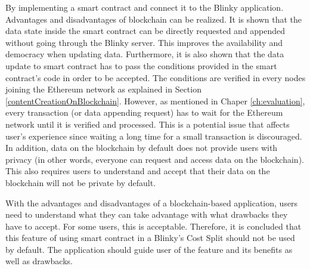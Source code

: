 \documentclass[twoside,numperchapter]{tutthesis} %
\newif\ifnameyear
\begin{document}
By implementing a smart contract and connect it to the Blinky application. Advantages and disadvantages of blockchain can be realized. It is shown that the data state inside the smart contract can be directly requested and appended without going through the Blinky server. This improves the availability and democracy when updating data. Furthermore, it is also shown that the data update to smart contract has to pass the conditions provided in the smart contract's code in order to be accepted. The conditions are verified in every nodes joining the Ethereum network as explained in Section \ref{contentCreationOnBlockchain}. However, as mentioned in Chaper \ref{ch:evaluation}, every transaction (or data appending request) has to wait for the Ethereum network until it is verified and processed. This is a potential issue that affects user's experience since waiting a long time for a small transaction is discouraged. In addition, data on the blockchain by default does not provide users with privacy (in other words, everyone can request and access data on the blockchain). This also requires users to understand and accept that their data on the blockchain will not be private by default.

With the advantages and disadvantages of a blockchain-based application, users need to understand what they can take advantage with what drawbacks they have to accept. For some users, this is acceptable. Therefore, it is concluded that this feature of using smart contract in a Blinky's Cost Split should not be used by default. The application should guide user of the feature and its benefits as well as drawbacks.




\ifnameyear
  
\else
  
\fi

\end{document}
